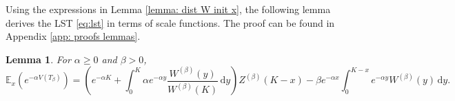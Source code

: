 \documentclass[reqno,12pt]{amsart}
\newtheorem{lemma}{Lemma}
\begin{document}

Using the expressions in Lemma \ref{lemma: dist W init x}, the following lemma derives the LST \eqref{eq:lst} in terms of scale functions. The proof can be found in Appendix \ref{app: proofs lemmas}.

\begin{lemma}\label{lemma: LST W Levy inti x}
    For $\alpha \geqslant 0$ and $\beta >0$,
    \begin{equation}\label{eq: LST Levy W init x}
        \mathbb{E}_x\left(e^{-\alpha V(T_\beta)}\right) = \left(e^{-\alpha K} + \int_0^K \alpha e^{-\alpha y}\frac{W^{(\beta)}(y)}{W^{(\beta)}(K)}\,\mathrm{d}y\right)Z^{(\beta)}(K-x) - \beta e^{-\alpha x}\int_0^{K-x}e^{-\alpha y}W^{(\beta)}(y)\,\mathrm{d}y.
    \end{equation}
\end{lemma}
\end{document}
